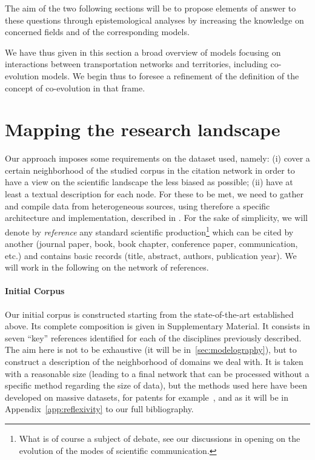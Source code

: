 \documentclass[galley]{jtlu-article-2col}
\begin{document}
The aim of the two following sections will be to propose elements of answer to these questions through epistemological analyses by increasing the knowledge on concerned fields and of the corresponding models.


We have thus given in this section a broad overview of models focusing on interactions between transportation networks and territories, including co-evolution models. We begin thus to foresee a refinement of the definition of the concept of co-evolution in that frame.






\section{Mapping the research landscape}

Our approach imposes some requirements on the dataset used, namely: (i) cover a certain neighborhood of the studied corpus in the citation network in order to have a view on the scientific landscape the less biased as possible; (ii) have at least a textual description for each node. For these to be met, we need to gather and compile data from heterogeneous sources, using therefore a specific architecture and implementation, described in \cite{raimbault2019exploration}. For the sake of simplicity, we will denote by \emph{reference} any standard scientific production\footnote{What is of course a subject of debate, see our discussions in opening on the evolution of the modes of scientific communication.} which can be cited by another (journal paper, book, book chapter, conference paper, communication, etc.) and contains basic records (title, abstract, authors, publication year). We will work in the following on the network of references.


\paragraph{Initial Corpus}

Our initial corpus is constructed starting from the state-of-the-art established above. Its complete composition is given in Supplementary Material. %
 It consists in seven ``key'' references identified for each of the disciplines previously described. The aim here is not to be exhaustive (it will be in~\ref{sec:modelography}), but to construct a description of the neighborhood of domains we deal with. It is taken with a reasonable size (leading to a final network that can be processed without a specific method regarding the size of data), but the methods used here have been developed on massive datasets, for patents for example~\cite{bergeaud2017classifying}, and as it will be in Appendix~\ref{app:reflexivity} to our full bibliography.
\end{document}
